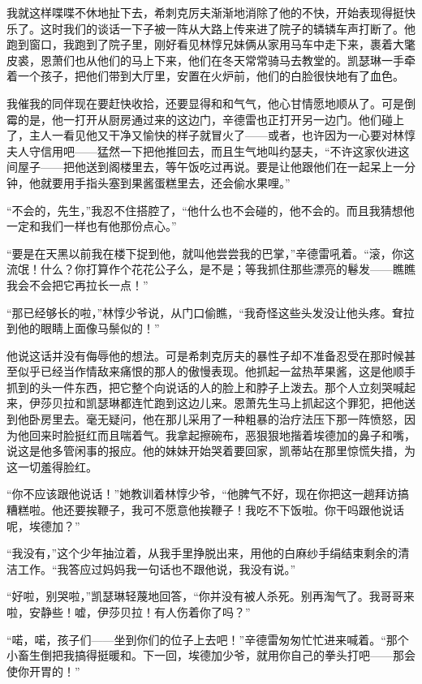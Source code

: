 \par 我就这样喋喋不休地扯下去，希刺克厉夫渐渐地消除了他的不快，开始表现得挺快乐了。这时我们的谈话一下子被一阵从大路上传来进了院子的辚辚车声打断了。他跑到窗口，我跑到了院子里，刚好看见林惇兄妹俩从家用马车中走下来，裹着大氅皮裘，恩萧们也从他们的马上下来，他们在冬天常常骑马去教堂的。凯瑟琳一手牵着一个孩子，把他们带到大厅里，安置在火炉前，他们的白脸很快地有了血色。
\par 我催我的同伴现在要赶快收拾，还要显得和和气气，他心甘情愿地顺从了。可是倒霉的是，他一打开从厨房通过来的这边门，辛德雷也正打开另一边门。他们碰上了，主人一看见他又干净又愉快的样子就冒火了——或者，也许因为一心要对林惇夫人守信用吧——猛然一下把他推回去，而且生气地叫约瑟夫，“不许这家伙进这间屋子——把他送到阁楼里去，等午饭吃过再说。要是让他跟他们在一起呆上一分钟，他就要用手指头塞到果酱蛋糕里去，还会偷水果哩。”
\par “不会的，先生，”我忍不住搭腔了，“他什么也不会碰的，他不会的。而且我猜想他一定和我们一样也有他那份点心。”
\par “要是在天黑以前我在楼下捉到他，就叫他尝尝我的巴掌，”辛德雷吼着。“滚，你这流氓！什么？你打算作个花花公子么，是不是；等我抓住那些漂亮的鬈发——瞧瞧我会不会把它再拉长一点！”
\par “那已经够长的啦，”林惇少爷说，从门口偷瞧，“我奇怪这些头发没让他头疼。耷拉到他的眼睛上面像马鬃似的！”
\par 他说这话并没有侮辱他的想法。可是希刺克厉夫的暴性子却不准备忍受在那时候甚至似乎已经当作情敌来痛恨的那人的傲慢表现。他抓起一盆热苹果酱，这是他顺手抓到的头一件东西，把它整个向说话的人的脸上和脖子上泼去。那个人立刻哭喊起来，伊莎贝拉和凯瑟琳都连忙跑到这边儿来。恩萧先生马上抓起这个罪犯，把他送到他卧房里去。毫无疑问，他在那儿采用了一种粗暴的治疗法压下那一阵愤怒，因为他回来时脸挺红而且喘着气。我拿起擦碗布，恶狠狠地揩着埃德加的鼻子和嘴，说这是他多管闲事的报应。他的妹妹开始哭着要回家，凯蒂站在那里惊慌失措，为这一切羞得脸红。
\par “你不应该跟他说话！”她教训着林惇少爷，“他脾气不好，现在你把这一趟拜访搞糟糕啦。他还要挨鞭子，我可不愿意他挨鞭子！我吃不下饭啦。你干吗跟他说话呢，埃德加？”
\par “我没有，”这个少年抽泣着，从我手里挣脱出来，用他的白麻纱手绢结束剩余的清洁工作。“我答应过妈妈我一句话也不跟他说，我没有说。”
\par “好啦，别哭啦，”凯瑟琳轻蔑地回答，“你并没有被人杀死。别再淘气了。我哥哥来啦，安静些！嘘，伊莎贝拉！有人伤着你了吗？”
\par “喏，喏，孩子们——坐到你们的位子上去吧！”辛德雷匆匆忙忙进来喊着。“那个小畜生倒把我搞得挺暖和。下一回，埃德加少爷，就用你自己的拳头打吧——那会使你开胃的！”
